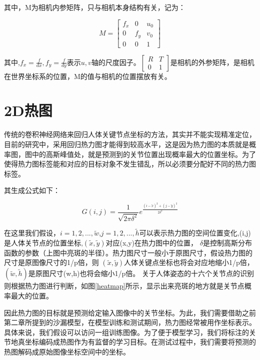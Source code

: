 其中，M为相机内参矩阵，只与相机本身结构有关，记为：

\begin{equation}
M = \left[ {\begin{array}{*{20}{c}}
{{f_x}}&0&{{u_0}}\\
0&{{f_y}}&{{v_0}}\\
0&0&1
\end{array}} \right]
\end{equation}

其中,${f_x} = \frac{f}{{dx}},{f_y} = \frac{f}{{dy}}$表示$u,v$轴的尺度因子。$
\left[ {\begin{array}{*{20}{c}}
R&T\\
0&1
\end{array}} \right]$是相机的外参矩阵，是相机在世界坐标系的位置，M的值与相机的位置摆放有关。

\section{2D热图}

传统的卷积神经网络来回归人体关键节点坐标的方法，其实并不能实现精准定位，目前的研究\cite{zhang2019distributionaware}中，采用回归热力图才能得到较高水平，这是因为热力图的本质就是概率图，图中的高斯峰值处，就是预测到的关节位置出现概率最大的位置坐标。为了使得热力图标签能和对应的目标对象不发生错乱，所以必须要分配好不同的热力图标签。

其生成公式如下：

\begin{equation}
G\left( {i,j} \right) = \frac{1}{{\sqrt {2\pi {\delta ^2}} }}{e^{\frac{{{{\left( {i - \widetilde x} \right)}^2} + {{\left( {j - \widetilde y} \right)}^2}}}{{2{\delta ^2}}}}}
\end{equation}

在这里我们假设，$i = 1,2,...,\widetilde w$,$j = 1,2,...,\widetilde h$可以表示热力图的空间位置变化,(i,j)是人体关节点的位置坐标,$ \left( {\widetilde x,\widetilde y} \right) $对应(x,y)在热力图中的位置， $ \delta $是控制高斯分布函数的参数（上图中亮斑的半径）。热力图尺寸一般小于原图尺寸，假设热力图的尺寸是原图像尺寸的1/p倍，则 $ \left( {\widetilde x,\widetilde y} \right) $人体关键点坐标也将会对应地缩小1/p倍，$ 
\left( {\widetilde w,\widetilde h} \right)$是原图尺寸(w,h)也将会缩小1/p倍。
关于人体姿态的十六个关节点的识别则根据热力图进行判断，如图\ref{heatmap}所示，显示出来亮斑的地方就是关节点概率最大的位置。

因此热力图的目标就是预测给定输入图像中的关节坐标。为此，我们需要借助之前第二章所提到的沙漏模型，在模型训练和测试期间，热力图经常被用作坐标表示。\cite{zhang2019distributionaware}具体来说，我们假设可以访问一组训练图像。为了便于模型学习，我们将标注的关节地真坐标编码成热图作为有监督的学习目标。在测试过程中，我们需要将预测的热图解码成原始图像坐标空间中的坐标。

